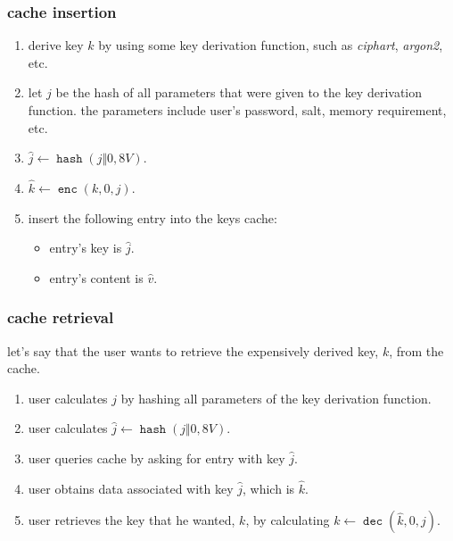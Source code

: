 \documentclass[twocolumn]{article}
\DeclareMathOperator{\enc}{\mathtt{enc}}
\DeclareMathOperator{\dec}{\mathtt{dec}}
\DeclareMathOperator{\hash}{\mathtt{hash}}
\begin{document}
\subsubsection{cache insertion}
\begin{enumerate}
    \item derive key $k$ by using some key derivation function, such as
    \emph{ciphart}, \emph{argon2}, etc.

    \item let $j$ be the hash of all parameters that were given to the key
    derivation function.  the parameters include user's password, salt,
    memory requirement, etc.

    \item $\hat j \gets \hash(j \Vert 0, 8V)$.

    \item $\hat k \gets \enc(k, 0, j)$.

    \item insert the following entry into the keys cache:
        \begin{itemize}
            \item entry's key is $\hat j$.
            \item entry's content is $\hat v$.
        \end{itemize}
\end{enumerate}

\subsubsection{cache retrieval}
let's say that the user wants to retrieve the expensively derived key, $k$,
from the cache.
\begin{enumerate}
    \item user calculates $j$ by hashing all parameters of the key
    derivation function.

    \item user calculates $\hat j \gets \hash(j \Vert 0, 8V)$.

    \item user queries cache by asking for entry with key $\hat j$.

    \item user obtains data associated with key $\hat j$, which is $\hat
    k$.

    \item user retrieves the key that he wanted, $k$, by calculating $k
    \gets \dec(\hat k, 0, j)$.
\end{enumerate}
\end{document}
